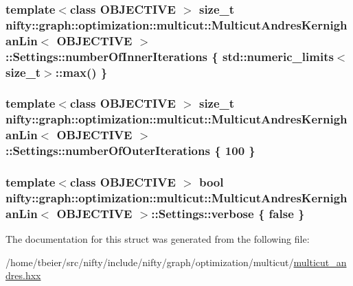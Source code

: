 \subsubsection[{number\+Of\+Inner\+Iterations}]{\setlength{\rightskip}{0pt plus 5cm}template$<$class O\+B\+J\+E\+C\+T\+I\+V\+E $>$ size\+\_\+t {\bf nifty\+::graph\+::optimization\+::multicut\+::\+Multicut\+Andres\+Kernighan\+Lin}$<$ O\+B\+J\+E\+C\+T\+I\+V\+E $>$\+::Settings\+::number\+Of\+Inner\+Iterations \{ std\+::numeric\+\_\+limits$<$size\+\_\+t$>$\+::max() \}}\label{structnifty_1_1graph_1_1optimization_1_1multicut_1_1MulticutAndresKernighanLin_1_1Settings_ae092e725d5fe422881649c9d649e4ae7}
\hypertarget{structnifty_1_1graph_1_1optimization_1_1multicut_1_1MulticutAndresKernighanLin_1_1Settings_a4a46fce3579186ead36d31f3b70da4be}{}
\subsubsection[{number\+Of\+Outer\+Iterations}]{\setlength{\rightskip}{0pt plus 5cm}template$<$class O\+B\+J\+E\+C\+T\+I\+V\+E $>$ size\+\_\+t {\bf nifty\+::graph\+::optimization\+::multicut\+::\+Multicut\+Andres\+Kernighan\+Lin}$<$ O\+B\+J\+E\+C\+T\+I\+V\+E $>$\+::Settings\+::number\+Of\+Outer\+Iterations \{ 100 \}}\label{structnifty_1_1graph_1_1optimization_1_1multicut_1_1MulticutAndresKernighanLin_1_1Settings_a4a46fce3579186ead36d31f3b70da4be}
\hypertarget{structnifty_1_1graph_1_1optimization_1_1multicut_1_1MulticutAndresKernighanLin_1_1Settings_ac00061ba934c687233bd9dcaffabb0e9}{}
\subsubsection[{verbose}]{\setlength{\rightskip}{0pt plus 5cm}template$<$class O\+B\+J\+E\+C\+T\+I\+V\+E $>$ bool {\bf nifty\+::graph\+::optimization\+::multicut\+::\+Multicut\+Andres\+Kernighan\+Lin}$<$ O\+B\+J\+E\+C\+T\+I\+V\+E $>$\+::Settings\+::verbose \{ false \}}\label{structnifty_1_1graph_1_1optimization_1_1multicut_1_1MulticutAndresKernighanLin_1_1Settings_ac00061ba934c687233bd9dcaffabb0e9}


The documentation for this struct was generated from the following file\+:\begin{DoxyCompactItemize}
\item 
/home/tbeier/src/nifty/include/nifty/graph/optimization/multicut/\hyperlink{multicut__andres_8hxx}{multicut\+\_\+andres.\+hxx}\end{DoxyCompactItemize}
